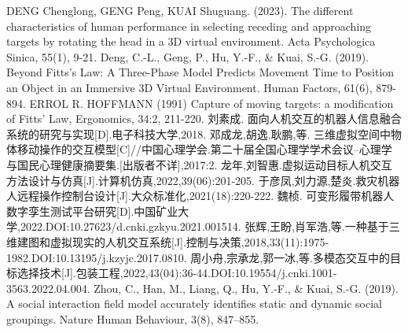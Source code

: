 \documentclass[12pt]{article}  %
\begin{document}
	\begin{thebibliography}{99}
		 DENG Chenglong, GENG Peng, KUAI Shuguang. (2023). The different characteristics of human performance in selecting receding and approaching targets by rotating the head in a 3D virtual environment. Acta Psychologica Sinica, 55(1), 9-21.
		 Deng, C.-L., Geng, P., Hu, Y.-F., \& Kuai, S.-G. (2019). Beyond Fitts’s Law: A Three-Phase Model Predicts Movement Time to Position an Object in an Immersive 3D Virtual Environment. Human Factors, 61(6), 879-894.
		 ERROL R. HOFFMANN (1991) Capture of moving targets: a modification of Fitts' Law, Ergonomics, 34:2, 211-220.
		 刘素成. 面向人机交互的机器人信息融合系统的研究与实现[D].电子科技大学,2018.
		 邓成龙,胡逸,耿鹏,等. 三维虚拟空间中物体移动操作的交互模型[C]//中国心理学会.第二十届全国心理学学术会议--心理学与国民心理健康摘要集.[出版者不详],2017:2.
		 龙年,刘智惠.虚拟运动目标人机交互方法设计与仿真[J].计算机仿真,2022,39(06):201-205.
		 于彦凤,刘力源,楚炎.救灾机器人远程操作控制台设计[J].大众标准化,2021(18):220-222.
		 魏桢. 可变形履带机器人数字孪生测试平台研究[D].中国矿业大学,2022.DOI:10.27623/d.cnki.gzkyu.2021.001514.
		 张辉,王盼,肖军浩,等.一种基于三维建图和虚拟现实的人机交互系统[J].控制与决策,2018,33(11):1975-1982.DOI:10.13195/j.kzyjc.2017.0810.
		 周小舟,宗承龙,郭一冰,等.多模态交互中的目标选择技术[J].包装工程,2022,43(04):36-44.DOI:10.19554/j.cnki.1001-3563.2022.04.004.
		 Zhou, C., Han, M., Liang, Q., Hu, Y.-F., \& Kuai, S.-G. (2019). A social interaction field model accurately identifies static and dynamic social groupings. Nature Human Behaviour, 3(8), 847–855.
	\end{thebibliography}
	
\end{document}
